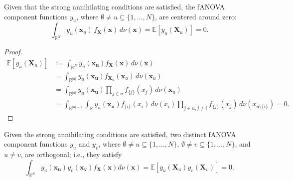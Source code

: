 \begin{proposition}\label{prop:zero_mean_classical}
Given that the strong annihilating conditions are satisfied, 
the fANOVA component functions $y_u$, where 
$\emptyset \neq u \subseteq \{1,\dots,N\}$, are centered around zero:
\begin{equation}
    \int_{\mathbb{R}^N} 
        y_u(\boldsymbol{x}_u)\, f_{\boldsymbol{X}}(\boldsymbol{x}) 
        \, d\nu (\boldsymbol{x})
    = \mathbb{E}[y_u(\boldsymbol{X}_u)] 
    = 0.
\end{equation}
\end{proposition}

\begin{proof}
\begin{align*}
    \mathbb{E}[y_u(\boldsymbol{X}_u)] &:= \int_{\mathbb{R}^{N}} y_u(\boldsymbol{x_u}) f_{\boldsymbol{X}}(\boldsymbol{x}) \, d\nu (\boldsymbol{x}) \\[0.5em]
    &= \int_{\mathbb{R}^{|u|}} y_u(\boldsymbol{x_u}) f_{\boldsymbol{X}_u}(\boldsymbol{x}_u) \, d\nu (\boldsymbol{x}_u) \\[0.5em]
    &= \int_{\mathbb{R}^{|u|}} y_u(\boldsymbol{x_u}) \prod_{j \in u} f_{\{j\}}(x_j) \, d\nu (\boldsymbol{x}_u) \\[0.5em]
    &= \int_{\mathbb{R}^{|u|-1}} \int_{\mathbb{R}} y_u(\boldsymbol{x_u}) f_{\{i\}}(x_i) \, d\nu(x_i) \prod_{j \in u, j \neq i} f_{\{j\}}(x_j) \, d\nu (x_{u \setminus \{i\}}) = 0.
\end{align*}
\end{proof}

\begin{proposition}\label{prop:orthogonality_classical}
    Given the strong annihilating conditions are satisfied, two distinct fANOVA component functions $y_u$ and $y_v$, where $\emptyset \neq u \subseteq \{1,\ldots,N\}$, $\emptyset \neq v \subseteq \{1,\ldots,N\}$, and $u \neq v$, are orthogonal; i.e., they satisfy
\begin{equation}
    \int_{\mathbb{R}^N} y_u(\boldsymbol{x_u}) y_v(\boldsymbol{x_v}) f_{\boldsymbol{X}}(\boldsymbol{x}) d\nu (\boldsymbol{x}) = \mathbb{E}[y_u(\boldsymbol{X}_u) y_v(\boldsymbol{X}_v)] = 0.
\end{equation}
\end{proposition}

